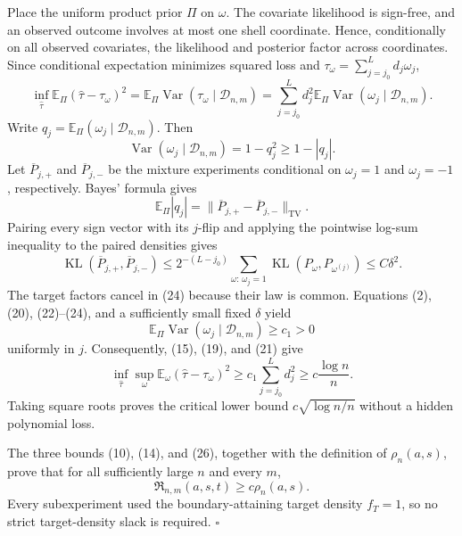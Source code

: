 Place the uniform product prior \(\Pi\) on \(\omega\). The covariate likelihood is sign-free, and an observed outcome involves at most one shell coordinate. Hence, conditionally on all observed covariates, the likelihood and posterior factor across coordinates. Since conditional expectation minimizes squared loss and \(\tau_\omega=\sum_{j=j_0}^Ld_j\omega_j\),
\[
 \inf_{\widehat\tau}
 \mathbb E_\Pi(\widehat\tau-\tau_\omega)^2
 =
 \mathbb E_\Pi\operatorname{Var}
       (\tau_\omega\mid\mathcal D_{n,m})
 =\sum_{j=j_0}^Ld_j^2
   \mathbb E_\Pi\operatorname{Var}
       (\omega_j\mid\mathcal D_{n,m}).
\tag{21}
\]
Write \(q_j=\mathbb E_\Pi(\omega_j\mid\mathcal D_{n,m})\). Then
\[
 \operatorname{Var}(\omega_j\mid\mathcal D_{n,m})
 =1-q_j^2\ge1-|q_j|.
\tag{22}
\]
Let \(\overline P_{j,+}\) and \(\overline P_{j,-}\) be the mixture experiments conditional on \(\omega_j=1\) and \(\omega_j=-1\), respectively. Bayes' formula gives
\[
 \mathbb E_\Pi|q_j|
 =\lVert\overline P_{j,+}-\overline P_{j,-}\rVert_{\mathrm{TV}}.
\tag{23}
\]
Pairing every sign vector with its \(j\)-flip and applying the pointwise log-sum inequality to the paired densities gives
\[
 \operatorname{KL}(\overline P_{j,+},\overline P_{j,-})
 \le 2^{-(L-j_0)}
 \sum_{\omega:\,\omega_j=1}
 \operatorname{KL}(P_\omega,P_{\omega^{(j)}})
 \le C\delta^2.
\tag{24}
\]
The target factors cancel in (24) because their law is common. Equations (2), (20), (22)--(24), and a sufficiently small fixed \(\delta\) yield
\[
 \mathbb E_\Pi\operatorname{Var}
   (\omega_j\mid\mathcal D_{n,m})
 \ge c_1>0
\tag{25}
\]
uniformly in \(j\). Consequently, (15), (19), and (21) give
\[
 \inf_{\widehat\tau}\sup_\omega
 \mathbb E_\omega(\widehat\tau-\tau_\omega)^2
 \ge c_1\sum_{j=j_0}^Ld_j^2
 \ge c\frac{\log n}{n}.
\tag{26}
\]
Taking square roots proves the critical lower bound \(c\sqrt{\log n/n}\) without a hidden polynomial loss.

The three bounds (10), (14), and (26), together with the definition of \(\rho_n(a,s)\), prove that for all sufficiently large \(n\) and every \(m\),
\[
 \mathfrak R_{n,m}(a,s,t)
 \ge c\rho_n(a,s).
\]
Every subexperiment used the boundary-attaining target density \(f_T=1\), so no strict target-density slack is required. \(\square\)